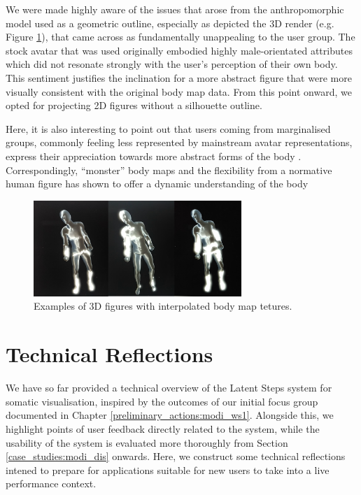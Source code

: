 We were made highly aware of the issues that arose from the anthropomorphic model used as a geometric outline, especially as depicted the 3D render (e.g. Figure \ref{fig:3d_render}), that came across as fundamentally unappealing to the user group. The stock avatar that was used originally embodied highly male-orientated attributes which did not resonate strongly with the user's perception of their own body. This sentiment justifies the inclination for a more abstract figure that were more visually consistent with the original body map data. From this point onward, we opted for projecting 2D figures without a silhouette outline.

Here, it is also interesting to point out that users coming from marginalised groups, commonly feeling less represented by mainstream avatar representations, express their appreciation towards more abstract forms of the body \cite{niehaus_making_2021}. Correspondingly, ``monster'' body maps and the flexibility from a normative human figure has shown to offer a dynamic understanding of the body \cite{hook_soma_2019}

\begin{figure}[ht]
    \centering
    \includegraphics[width=0.7\textwidth]{Chapters/Figures/modi_dis/3d_render_examples.png}
    \caption{Examples of 3D figures with interpolated body map tetures.}
    \label{fig:3d_render}
\end{figure}

\section{Technical Reflections}

We have so far provided a technical overview of the Latent Steps system for somatic visualisation, inspired by the outcomes of our initial focus group documented in Chapter \ref{preliminary_actions:modi_ws1}. Alongside this, we highlight points of user feedback directly related to the system, while the usability of the system is evaluated more thoroughly from Section \ref{case_studies:modi_dis} onwards. Here, we construct some technical reflections intened to prepare for applications suitable for new users to take into a live performance context.

